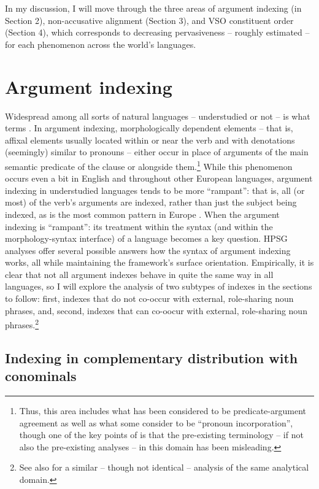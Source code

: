 \documentclass[output=paper
                ,modfonts
                ,nonflat
	        ,collection
	        ,collectionchapter
	        ,collectiontoclongg
 	        ,biblatex
                ,babelshorthands
                ,newtxmath
                ,draftmode
                ,colorlinks, citecolor=brown
]{./langsci/langscibook}
\begin{document}
{In my discussion, I will move through the three areas of argument indexing (in Section 2), non-accusative alignment (Section 3), and VSO constituent order (Section 4), which corresponds to decreasing pervasiveness -- roughly estimated -- for each phenomenon across the world's languages.       

\section{Argument indexing}

Widespread among all sorts of natural languages -- understudied or not -- is what \citet{haspelmath13} terms . In argument indexing, morphologically dependent elements -- that is, affixal elements usually located within or near the verb and with denotations (seemingly) similar to pronouns -- either occur in place of arguments of the main semantic predicate of the clause or alongside them.\footnote{Thus, this area includes what has been considered to be predicate-argument agreement as well as what some consider to be ``pronoun incorporation'', though one of the key points of \citet{haspelmath13} is that the pre-existing terminology -- if not also the pre-existing analyses -- in this domain has been misleading.} While this phenomenon occurs even a bit in English and throughout other European languages, argument indexing in understudied languages tends to be more ``rampant'': that is, all (or most) of the verb's arguments are indexed, rather than just the subject being indexed, as is the most common pattern in Europe \citep{siewierskaWALSvpm}. When the argument indexing is ``rampant'': its treatment within the syntax (and within the morphology-syntax interface) of a language becomes a key question. HPSG analyses offer several possible answers how the syntax of argument indexing works, all while maintaining the framework's surface orientation. Empirically, it is clear that not all argument indexes behave in quite the same way in all languages, so I will explore the analysis of two subtypes of indexes in the sections to follow: first, indexes that do not co-occur with external, role-sharing noun phrases, and, second, indexes that can co-oocur with external, role-sharing noun phrases.\footnote{See also \citet{saleem10} for a similar -- though not identical -- analysis of the same analytical domain.}   

\subsection{Indexing in complementary distribution with conominals} \label{pro-indexes}

}
\end{document}
